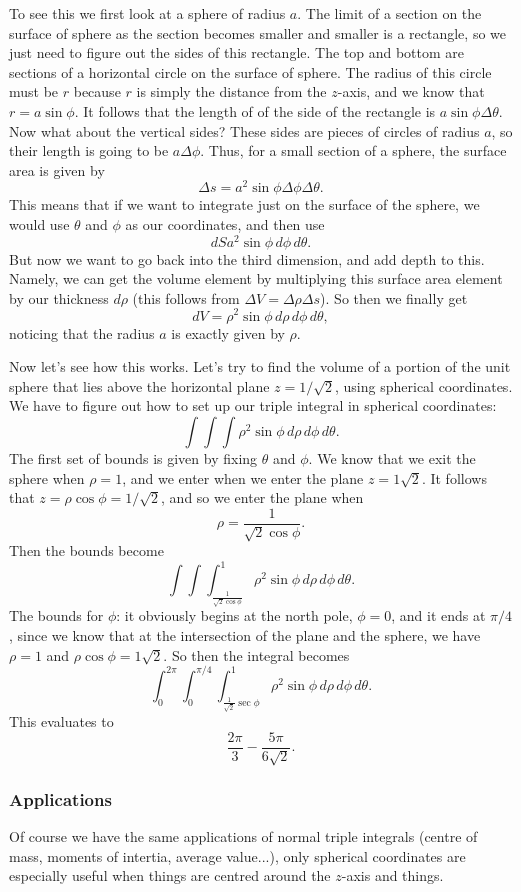 To see this we first look at a sphere of radius $a$. The limit of a section on the surface of sphere as the section becomes smaller and smaller is a rectangle, so we just need to figure out the sides of this rectangle. The top and bottom are sections of a horizontal circle on the surface of sphere. The radius of this circle must be $r$ because $r$ is simply the distance from the $z$-axis, and we know that $r = a \sin \phi$. It follows that the length of of the side of the rectangle is $a \sin \phi \Delta \theta$. Now what about the vertical sides? These sides are pieces of circles of radius $a$, so their length is going to be $a \Delta \phi$. Thus, for a small section of a sphere, the surface area is given by
\[ \Delta s = a^2 \sin \phi \Delta \phi \Delta \theta. \]
This means that if we want to integrate just on the surface of the sphere, we would use $\theta$ and $\phi$ as our coordinates, and then use
\[ dS a^2 \sin \phi \,d\phi \,d\theta. \]
But now we want to go back into the third dimension, and add depth to this. Namely, we can get the volume element by multiplying this surface area element by our thickness $d\rho$ (this follows from $\Delta V = \Delta \rho \Delta s$). So then we finally get
\[ dV = \rho^2 \sin \phi \,d\rho\,d\phi\,d\theta, \]
noticing that the radius $a$ is exactly given by $\rho$.

Now let's see how this works.
\bex
Let's try to find the volume of a portion of the unit sphere that lies above the horizontal plane $z = 1/\sqrt{2}$, using spherical coordinates. We have to figure out how to set up our triple integral in spherical coordinates:
\[ \int \int \int \rho^2 \sin \phi \,d\rho\,d\phi\,d\theta. \]
The first set of bounds is given by fixing $\theta$ and $\phi$. We know that we exit the sphere when $\rho = 1$, and we enter when we enter the plane $z = 1\sqrt2$. It follows that $z = \rho \cos \phi = 1/\sqrt2$, and so we enter the plane when 
\[ \rho = \frac 1{\sqrt2 \cos \phi}. \]
Then the bounds become 
\[ \int \int \int_{\frac 1{\sqrt2 \cos \phi}}^1 \rho^2 \sin \phi \,d\rho\,d\phi\,d\theta. \]
The bounds for $\phi$: it obviously begins at the north pole, $\phi=0$, and it ends at $\pi/4$, since we know that at the intersection of the plane and the sphere, we have $\rho = 1$ and $\rho \cos \phi = 1\sqrt2$. So then the integral becomes 
\[ \int_0^{2\pi} \int_0^{\pi/4} \int_{\frac 1{\sqrt2} \sec \phi}^1 \rho^2 \sin \phi \,d\rho\,d\phi\,d\theta. \]
This evaluates to
\[ \frac{2\pi}3 - \frac{5\pi}{6\sqrt2}. \]
\eex

\subsubsection{Applications}
Of course we have the same applications of normal triple integrals (centre of mass, moments of intertia, average value...), only spherical coordinates are especially useful when things are centred around the $z$-axis and things.


